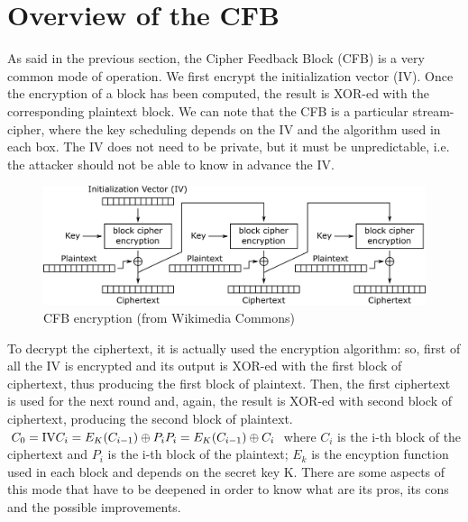 \documentclass[11 pt]{article}
\begin{document}
\section{Overview of the CFB}
As said in the previous section, the Cipher Feedback Block (CFB) is a very common mode of operation. We first encrypt the initialization vector (IV). Once the encryption of a block has been computed, the result is XOR-ed with the corresponding plaintext block. We can note that the CFB is a particular stream-cipher, where the key scheduling depends on the IV and the algorithm used in each box. The IV does not need to be private, but it must be unpredictable, i.e. the attacker should not be able to know in advance the IV.
\begin{figure}[!ht]
	\centering %
	\includegraphics[width=1\textwidth]{CFB_encryption-hw1-1699981.png} %
	\caption{CFB encryption (from Wikimedia Commons)} %
	\label{fig:CFB_encryption}
\end{figure}
To decrypt the ciphertext, it is actually used the encryption algorithm: so, first of all the IV is encrypted and its output is XOR-ed with the first block of ciphertext, thus producing the first block of plaintext. Then, the first ciphertext is used for the next round and, again, the result is XOR-ed with second block of ciphertext, producing the second block of plaintext.
\begin{math}
\newline\newline
C_{0}= {\mbox{IV}}
\newline\newline
C_{i}=E_{K}(C_{i-1})\oplus P_{i}
\newline\newline
{P_{i}=E_{K}(C_{i-1})\oplus C_{i}}
\newline\newline
\end{math}
where $C_{i}$ is the i-th block of the ciphertext and $P_{i}$ is the i-th block of the plaintext; $ E_k $ is the encyption function used in each block and depends on the secret key K.
There are some aspects of this mode that have to be deepened in order to know what are its pros, its cons and the possible improvements.
\end{document}
